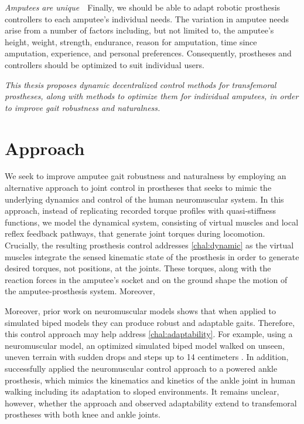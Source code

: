 \begin{challenges}
    \item\label{chal:amputees_unique} \emph{Amputees are unique}~~Finally, we
    should be able to adapt robotic prosthesis controllers to each amputee's
    individual needs. The variation in amputee needs arise from a number of
    factors including, but not limited to, the amputee's height, weight,
    strength, endurance, reason for amputation, time since amputation,
    experience, and personal preferences. Consequently, prostheses and
    controllers should be optimized to suit individual users.
\end{challenges}

\begin{fullwidth} \emph{This thesis proposes dynamic decentralized control
methods for transfemoral prostheses, along with methods to optimize them for
individual amputees, in order to improve gait robustness and naturalness.}
\end{fullwidth}

\section{Approach}\label{sec:intro_approach}

We seek to improve amputee gait robustness and naturalness by employing an
alternative approach to joint control in prostheses that seeks to mimic the
underlying dynamics and control of the human neuromuscular system. In this
approach, instead of replicating recorded torque profiles with quasi-stiffness
functions, we model the dynamical system, consisting of virtual muscles and
local reflex feedback pathways, that generate joint torques during locomotion.
Crucially, the resulting prosthesis control addresses \cref{chal:dynamic} as the
virtual muscles integrate the sensed kinematic state of the prosthesis in order
to generate desired torques, not positions, at the joints. These torques, along
with the reaction forces in the amputee's socket and on the ground shape the
motion of the amputee-prosthesis system. Moreover, 

Moreover, prior work on neuromuscular models shows that when applied to
simulated biped models they can produce robust and adaptable gaits. Therefore,
this control approach may help address \cref{chal:adaptability}. For example,
using a neuromuscular model, an optimized simulated biped model walked on
unseen, uneven terrain with sudden drops and steps up to 14 centimeters
\citep{song2015neural}. In addition, \citet{eilenberg2010control} successfully
applied the neuromuscular control approach to a powered ankle prosthesis, which
mimics the kinematics and kinetics of the ankle joint in human walking including
its adaptation to sloped environments.  It remains unclear, however, whether the
approach and observed adaptability extend to transfemoral prostheses with both
knee and ankle joints.

